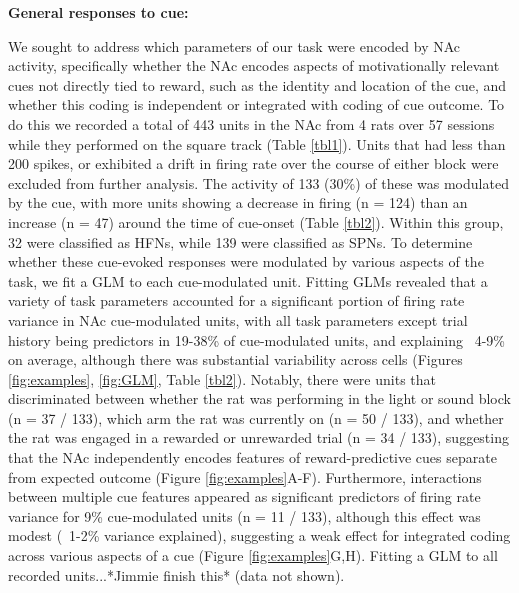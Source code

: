 \documentclass[11pt]{article}
\begin{document}
{\bf General responses to cue:}

We sought to address which parameters of our task were encoded by NAc activity, specifically whether the NAc encodes aspects of motivationally relevant cues not directly tied to reward, such as the identity and location of the cue, and whether this coding is independent or integrated with coding of cue outcome. To do this we recorded a total of 443 units  in the NAc from 4 rats over 57 sessions while they performed on the square track (Table \ref{tbl1}). Units that had less than 200 spikes, or exhibited a drift in firing rate over the course of either block were excluded from further analysis. The activity of 133 (30\%) of these was modulated by the cue, with more units showing a decrease in firing (n = 124) than an increase (n = 47) around the time of cue-onset (Table \ref{tbl2}). Within this group, 32 were classified as HFNs, while 139 were classified as SPNs. To determine whether these cue-evoked responses were modulated by various aspects of the task, we fit a GLM to each cue-modulated unit. Fitting GLMs revealed that a variety of task parameters accounted for a significant portion of firing rate variance in NAc cue-modulated units, with all task parameters except trial history being predictors in 19-38\% of cue-modulated units, and explaining ~4-9\% on average, although there was substantial variability across cells (Figures \ref{fig:examples}, \ref{fig:GLM}, Table \ref{tbl2}). Notably, there were units that discriminated between whether the rat was performing in the light or sound block (n = 37 / 133), which arm the rat was currently on (n = 50 / 133), and whether the rat was engaged in a rewarded or unrewarded trial (n = 34 / 133), suggesting that the NAc independently encodes features of reward-predictive cues separate from expected outcome (Figure \ref{fig:examples}A-F). Furthermore, interactions between multiple cue features appeared as significant predictors of firing rate variance for 9\% cue-modulated units (n = 11 / 133), although this effect was modest (~1-2\% variance explained), suggesting a weak effect for integrated coding across various aspects of a cue (Figure \ref{fig:examples}G,H). Fitting a GLM to all recorded units...*Jimmie finish this* (data not shown).
\end{document}
